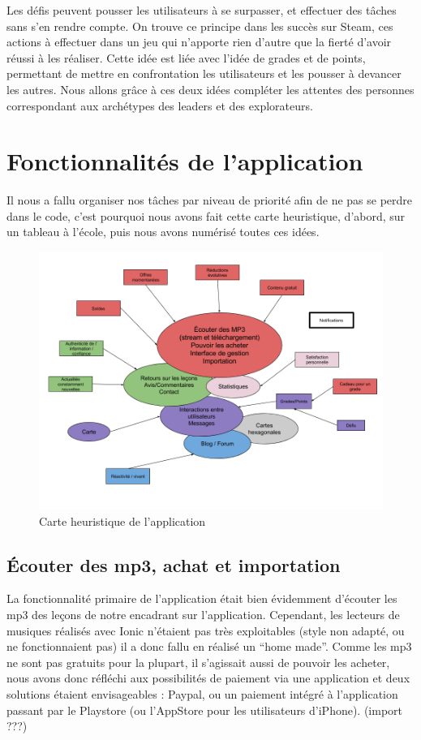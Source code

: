 \documentclass[pidr]{tnreport}
\begin{document}
Les défis peuvent pousser les utilisateurs à se surpasser, et effectuer des tâches sans s’en rendre compte. On trouve ce principe dans les succès sur Steam, ces actions à effectuer dans un jeu qui n’apporte rien d’autre que la fierté d’avoir réussi à les réaliser. Cette idée est liée avec l’idée de grades et de points, permettant de mettre en confrontation les utilisateurs et les pousser à devancer les autres. Nous allons grâce à ces deux idées compléter les attentes des personnes correspondant aux archétypes des leaders et des explorateurs.

\newpage
\section{Fonctionnalités de l’application}


Il nous a fallu organiser nos tâches par niveau de priorité afin de ne pas se perdre dans le code, c’est pourquoi nous avons fait cette carte heuristique, d’abord, sur un tableau à l’école, puis nous avons numérisé toutes ces idées.
\begin{figure}[h]
  \centering
  \includegraphics[width=17cm]{figures/vue_ensemble}
  \caption{Carte heuristique de l'application}
  \label{fig:ensemble-view}
\end{figure}


\subsection{Écouter des mp3, achat et importation}

La fonctionnalité primaire de l’application était bien évidemment d’écouter les mp3 des leçons de notre encadrant sur l’application. Cependant, les lecteurs de musiques réalisés avec Ionic n’étaient pas très exploitables (style non adapté, ou ne fonctionnaient pas) il a donc fallu en réalisé un “home made”. Comme les mp3 ne sont pas gratuits pour la plupart, il s’agissait aussi de pouvoir les acheter, nous avons donc réfléchi aux possibilités de paiement via une application et deux solutions étaient envisageables : Paypal, ou un paiement intégré à l’application passant par le Playstore (ou l’AppStore pour les utilisateurs d’iPhone).
(import ???)
\end{document}
